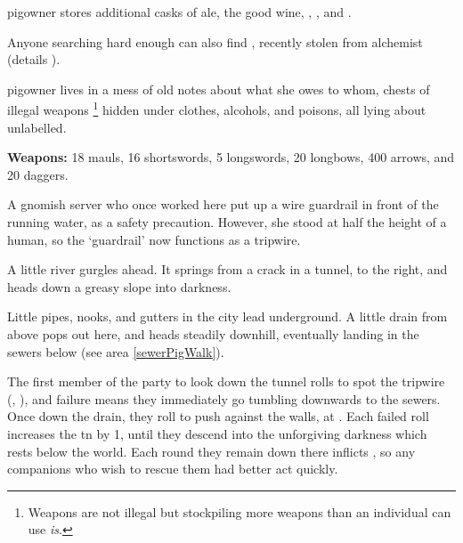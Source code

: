 \begin{multicols}{2}


\Gls{pigowner} stores additional casks of ale, the good wine, \rations, \rations, and \rations.

Anyone searching hard enough can also find \lootTalisman, recently stolen from \gls{alchemist} (details ).


\Gls{pigowner} lives in a mess of old notes about what she owes to whom, chests of illegal weapons%
\footnote{Weapons are not illegal but stockpiling more weapons than an individual can use \emph{is}.}
hidden under clothes, alcohols, and poisons, all lying about unlabelled.

\textbf{Weapons:} 18 mauls, 16 shortswords, 5 longswords, 20 longbows, 400 arrows, and 20 daggers.


\begin{exampletext}
  A gnomish \gls{server} who once worked here put up a wire guardrail in front of the running water, as a safety precaution.
  However, she stood at half the height of a human, so the `guardrail' now functions as a tripwire.
\end{exampletext}

\begin{boxtext}
  A little river gurgles ahead.
  It springs from a crack in a tunnel, to the right, and heads down a greasy slope into darkness.
\end{boxtext}

Little pipes, nooks, and gutters in the city lead underground.
A little drain from above pops out here, and heads steadily downhill, eventually landing in the sewers below (see area \vref{sewerPigWalk}).

The first member of the party to look down the tunnel rolls to spot the tripwire (, \tn[8]), and failure means they immediately go tumbling downwards to the sewers.
Once down the drain, they roll  to push against the walls, at \tn[9].
Each failed roll increases the \gls{tn} by 1, until they descend into the unforgiving darkness which rests below the world.
Each round they remain down there inflicts , so any companions who wish to rescue them had better act quickly.



\end{multicols}
